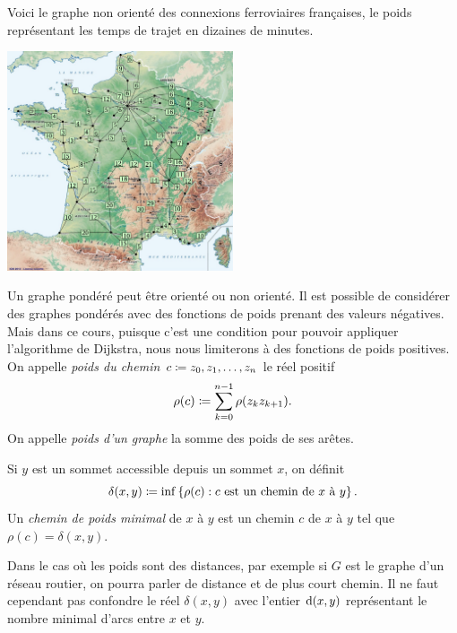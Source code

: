 \documentclass{magnolia}
\begin{document}
\begin{exempleUnique}
\exemple Voici le graphe non orienté des connexions ferroviaires françaises, le poids
  représentant les temps de trajet en dizaines de minutes.
\begin{center}
\includegraphics[width=0.5\textwidth]{../../Commun/Images/python-cours-france-train}\\
\end{center}
\end{exempleUnique}

\begin{remarques}
\remarque Un graphe pondéré peut être orienté ou non orienté.
\remarque Il est possible de considérer des graphes pondérés avec des fonctions de poids
  prenant des valeurs négatives. Mais dans ce cours, puisque c'est une condition pour
  pouvoir
  appliquer l'algorithme de Dijkstra, nous nous limiterons à des fonctions de poids
  positives.
\remarque On appelle \emph{poids du chemin} $c\coloneqq z_0,z_1,\ldots,z_n$ le réel
  positif
  \[\rho(c)\coloneqq \sum_{k=0}^{n-1} \rho(z_k z_{k+1}).\]
\remarque On appelle \emph{poids d'un graphe} la somme des poids de ses arêtes.
\end{remarques}

\begin{definition}
  Si $y$ est un sommet accessible depuis un sommet $x$, on définit
  \[\delta(x, y) \coloneqq \inf \left\{\rho(c) : c
        \textnormal{ est un chemin de } x \textnormal{ à } y\right\}.\]
  Un \emph{chemin de poids minimal} de $x$ à $y$ est un chemin $c$
  de $x$ à $y$ tel que $\rho(c) = \delta(x, y)$.
\end{definition}

\begin{remarqueUnique}
\remarque Dans le cas où les poids sont des distances, par exemple
  si $G$ est le graphe d'un réseau routier, on pourra parler de distance et de plus court
  chemin. Il ne faut cependant pas confondre le réel $\delta(x,y)$ avec l'entier
  ${\rm d}(x,y)$ représentant le nombre minimal d'arcs entre $x$ et $y$.
\end{remarqueUnique}
  
\end{document}
